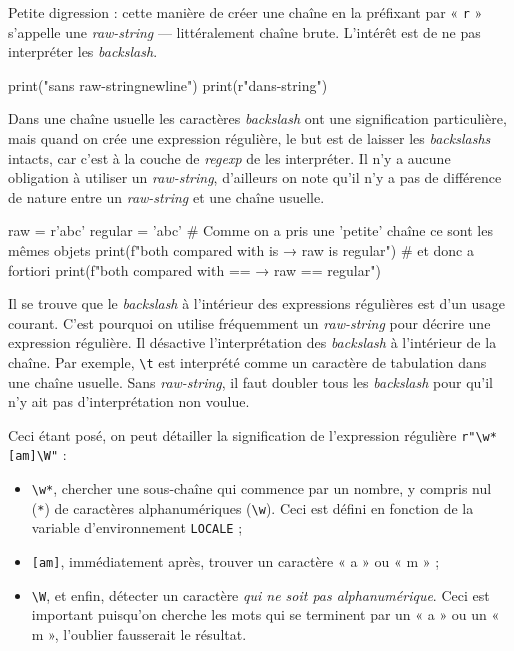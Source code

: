 Petite digression : cette manière de créer une chaîne en la préfixant par « \texttt{r} » s'appelle une \textit{raw-string} --- littéralement chaîne brute. L'intérêt est de ne pas interpréter les \textit{backslash}.
\begin{idleconsole}
	\begin{pyconsole}
		print("sans raw-string\nun newline")
		print(r"dans\nunraw-string")
	\end{pyconsole}
\end{idleconsole}

Dans une chaîne usuelle les caractères \textit{backslash} ont une signification particulière, mais quand on crée une expression régulière, le but est de laisser les \textit{backslashs} intacts, car c'est à la couche de \textit{regexp} de les interpréter.
Il n'y a aucune obligation à utiliser un \textit{raw-string}, d'ailleurs on note qu'il n'y a pas de différence de nature entre un \textit{raw-string} et une chaîne usuelle.

\begin{idleconsole}
	\begin{pyconsole}
raw = r'abc'
regular = 'abc'
# Comme on a pris une 'petite' chaîne ce sont les mêmes objets
print(f"both compared with is → {raw is regular}")
# et donc a fortiori
print(f"both compared with == → {raw == regular}")
	\end{pyconsole}
\end{idleconsole}

Il se trouve que le \textit{backslash} à l'intérieur des expressions régulières est d'un usage courant. C'est pourquoi on utilise fréquemment un \textit{raw-string} pour décrire une expression régulière. Il désactive l'interprétation des \textit{backslash} à l'intérieur de la chaîne. Par exemple, \lstinline[basicstyle={\small\shellttfont}]{\t} est interprété comme un caractère de tabulation dans une chaîne usuelle. Sans \textit{raw-string}, il faut doubler tous les \textit{backslash} pour qu'il n'y ait pas d'interprétation non voulue.

Ceci étant posé, on peut détailler la signification de l'expression régulière \lstinline[basicstyle={\small\shellttfont}]{r"\w*[am]\W"} :
\begin{itemize}
\item \lstinline[basicstyle={\small\shellttfont}]{\w*}, chercher une sous-chaîne qui commence par un nombre, y compris nul (\texttt{*}) de caractères alphanumériques (\lstinline[basicstyle={\small\shellttfont}]{\w}). Ceci est défini en fonction de la variable d’environnement \texttt{LOCALE} ;
\item \lstinline[basicstyle={\small\shellttfont}]{[am]}, immédiatement après, trouver un caractère « a » ou « m » ;
\item \lstinline[basicstyle={\small\shellttfont}]{\W}, et enfin, détecter un caractère \textit{qui ne soit pas alphanumérique}. Ceci est important puisqu'on cherche les mots qui se terminent par un « a » ou un « m », l'oublier fausserait le résultat.
\end{itemize}

